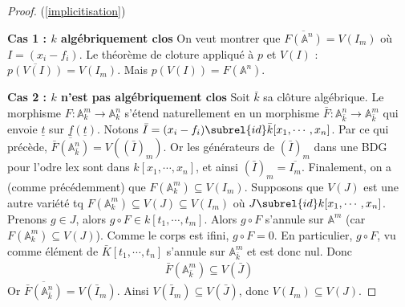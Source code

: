             \begin{proof} (\ref{implicitisation})
                \item \textbf{Cas 1 : $k$ algébriquement clos} On veut montrer que $\overline{F(\mathbb{A}^n)} = V(I_m)$ où $I = (x_i - f_i)$. Le théorème de cloture appliqué à $p$ et $V(I)$ : $\overline{p(V(I))} = V(I_m)$. Mais $p(V(I)) = F(\mathbb{A}^n)$.
                \item \textbf{Cas 2 : $k$ n'est pas algébriquement clos} Soit $\bar k$ sa clôture algébrique. Le morphisme $F : \mathbb{A}^m_k \to \mathbb{A}^n_k$ s'étend naturellement en un morphisme $\bar F : \mathbb{A}^n_{\bar k} \to \mathbb{A}^m_{\bar k}$ qui envoie $\underline{t}$ sur $\underline{f}(\underline{t})$. Notons $\bar I = (x_i - f_i) \subrel{id} \bar k[x_1, \cdots, x_n]$. Par ce qui précède, $\overline{\bar F(\mathbb{A}^n_{\bar k})} = V((\bar I)_m)$. Or les générateurs de $(\bar I)_m$ dans une BDG pour l'odre lex sont dans $k[x_1, \cdots, x_n]$, et ainsi $(\bar I)_m = \overline{I_m}$. Finalement, on a (comme précédemment) que $F(\mathbb{A}^m_k) \subseteq V(I_m)$. Supposons que $V(J)$ est une autre variété tq $F(\mathbb{A}^m_k) \subseteq V(J) \subseteq V(I_m)$ où $J \subrel{id} k[x_1, \cdots, x_n]$. Prenons $g \in J$, alors $g \circ F \in k[t_1, \cdots, t_m]$. Alors $g \circ F$ s'annule sur $\mathbb{A}^m$ (car $F(\mathbb{A}^m_k) \subseteq V(J)$). Comme le corps est ifini, $g \circ F = 0$. En particulier, $g \circ F$, vu comme élément de $\bar K[t_1, \cdots, t_n]$ s'annule sur $\mathbb{A}^m_{\bar k}$ et est donc nul. Donc
                \begin{align*}
                    \bar F(\mathbb{A}^m_{\bar k}) \subseteq V(\bar J)
                \end{align*}
                Or $\overline{\bar F(\mathbb{A}^n_{\bar k})} = V(\bar I_m)$. Ainsi $V(\bar I_m) \subseteq V(\bar J)$, donc $V(I_m) \subseteq V(J)$.
            \end{proof}

